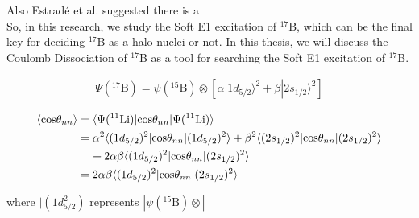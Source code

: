 Also Estradé et al. \cite{Estrade} suggested there is a
\\
So, in this research, we study the Soft E1 excitation of ${}^{17}$B, which can be the final key for deciding ${}^{17}$B as a halo nuclei or not. In this thesis, we will discuss the Coulomb Dissociation of ${}^{17}$B as a tool for searching the Soft E1 excitation of ${}^{17}$B. 

\begin{align}
    \Psi({}^{17}\text{B}) = \psi({}^{15}\text{B}) \otimes [\alpha |1d_{5/2} \rangle^2 + \beta |2s_{1/2} \rangle^2]
\end{align}

\begin{align}
    \langle \text{cos} \theta_{nn} \rangle &= \langle \Psi({}^{11}\text{Li}) | \text{cos} \theta_{nn} | \Psi({}^{11}\text{Li}) \rangle \notag \\
    &= \alpha^2 \langle (1d_{5/2})^2 | \text{cos} \theta_{nn} | (1d_{5/2})^2 \rangle + \beta^2 \langle (2s_{1/2})^2 | \text{cos} \theta_{nn} | (2s_{1/2})^2 \rangle \notag \\
    &\hspace{4mm} + 2\alpha \beta \langle (1d_{5/2})^2 | \text{cos} \theta_{nn} | (2s_{1/2})^2 \rangle \notag \\
    &= 2\alpha \beta \langle (1d_{5/2})^2 | \text{cos} \theta_{nn} | (2s_{1/2})^2 \rangle
\end{align}

where $|(1d_{5/2}^2)$ represents $|\psi({}^{15}\text{B})\otimes|$
